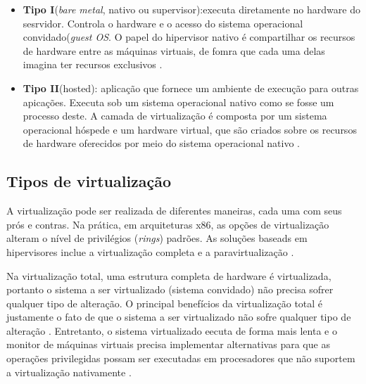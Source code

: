 \begin{itemize}
\item \textbf{Tipo I}(\textit{bare metal}, nativo ou supervisor):executa diretamente no hardware do sesrvidor. Controla o hardware e o acesso do sistema operacional convidado(\textit{guest OS}. O papel do hipervisor nativo é compartilhar os recursos de hardware entre as máquinas virtuais, de fomra que cada uma delas imagina ter recursos exclusivos \cite{manoel}.

\item \textbf{Tipo II}(hosted): aplicação que fornece um ambiente de execução para outras apicações. Executa sob um sistema operacional nativo como se fosse um processo deste. A camada de virtualização é composta por um sistema operacional hóspede e um hardware virtual, que são criados sobre os recursos de hardware oferecidos por meio do sistema operacional nativo \cite{manoel}.
\end{itemize}

\subsection{Tipos de virtualização}
A virtualização pode ser realizada de diferentes maneiras, cada uma com seus prós e contras. Na prática, em arquiteturas x86, as opções de virtualização alteram o nível de privilégios (\textit{rings}) padrões. As soluções baseads em hipervisores inclue a virtualização completa e a paravirtualização \cite{manoel}.

Na virtualização total, uma estrutura completa de hardware é virtualizada, portanto o sistema a ser virtualizado (sistema convidado) não precisa sofrer qualquer tipo de alteração. O principal benefícios da virtualização total é justamente o fato de que o sistema a ser virtualizado não sofre qualquer tipo de alteração \cite{marcos}. Entretanto, o sistema virtualizado eecuta de forma mais lenta e o monitor de máquinas virtuais precisa implementar alternativas para que as operações privilegidas possam ser executadas em procesadores que não suportem a virtualização nativamente \cite{marcos}.

